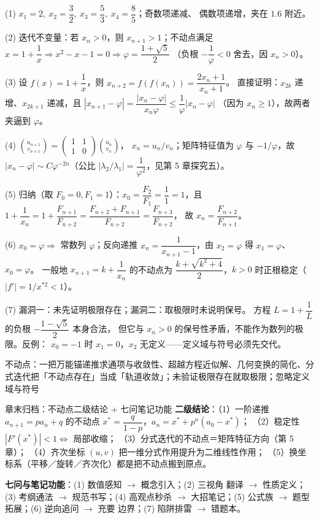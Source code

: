 \begin{solution}
(1) $x_1=2,\ x_2=\dfrac32,\ x_3=\dfrac53,\ x_4=\dfrac85$；奇数项递减、
偶数项递增，夹在 $1.6$ 附近。

(2) 迭代不变量：若 $x_n>0$，则 $x_{n+1}>1$；不动点满足
$x=1+\dfrac1x\Rightarrow x^2-x-1=0\Rightarrow \varphi=\dfrac{1+\sqrt5}{2}$
（负根 $-\dfrac1\varphi<0$ 舍去，因 $x_n>0$）。

(3) 设 $f(x)=1+\dfrac1x$，则 $x_{n+2}=f(f(x_n))=\dfrac{2x_n+1}{x_n+1}$。
直接证明：$x_{2k}$ 递增、$x_{2k+1}$ 递减，且
$|x_{n+1}-\varphi|=\dfrac{|x_n-\varphi|}{x_n\varphi}\le\dfrac1\varphi|x_n-\varphi|$
（因为 $x_n\ge1$），故两者夹逼到 $\varphi$。

(4) $\binom{u_{n+1}}{v_{n+1}}=\begin{pmatrix}1&1\\1&0\end{pmatrix}\binom{u_n}{v_n}$，
$x_n=u_n/v_n$；矩阵特征值为 $\varphi$ 与 $-1/\varphi$，故
$|x_n-\varphi|\sim C\varphi^{-2n}$（公比 $\left|\lambda_2/\lambda_1\right|
=\dfrac1{\varphi^2}$，见第 5 章探究五）。

(5) 归纳（取 $F_0=0,F_1=1$）：$x_0=\dfrac{F_2}{F_1}=\dfrac11=1$，且
$1+\dfrac1{x_n}=1+\dfrac{F_{n+1}}{F_{n+2}}
=\dfrac{F_{n+2}+F_{n+1}}{F_{n+2}}=\dfrac{F_{n+3}}{F_{n+2}}$，
故 $x_n=\dfrac{F_{n+2}}{F_{n+1}}$。

(6) $x_0=\varphi\Rightarrow$ 常数列 $\varphi$；反向递推
$x_n=\dfrac1{x_{n+1}-1}$，由 $x_2=\varphi$ 得 $x_1=\varphi$、$x_0=\varphi$。
一般地 $x_{n+1}=k+\dfrac1{x_n}$ 的不动点为
$\dfrac{k+\sqrt{k^2+4}}2$，$k>0$ 时正根稳定（$|f'|=1/x^{*2}<1$）。

(7) 漏洞一：未先证明极限存在；漏洞二：取极限时未说明保号。
方程 $L=1+\dfrac1L$ 的负根 $-\dfrac{1-\sqrt5}{2}$ 本身合法，
但它与 $x_n>0$ 的保号性矛盾，不能作为数列的极限。反例：
$x_0=-1$ 时 $x_1=0$，$x_2$ 无定义——定义域与符号必须先交代。
\end{solution}

\begin{conccard}{不动点：一把万能锚}{递推求通项与收敛性、超越方程近似解、几何变换的简化、分式迭代}{把「不动点存在」当成「轨道收敛」；未验证极限存在就取极限；忽略定义域与符号}
\end{conccard}

\begin{notezone}{章末归档：不动点二级结论 + 七问笔记功能}
\textbf{二级结论}：（1）一阶递推 $a_{n+1}=pa_n+q$ 的不动点
$x^*=\dfrac q{1-p}$，$a_n=x^*+p^n(a_0-x^*)$；
（2）稳定性 $|F'(x^*)|<1\Leftrightarrow$ 局部收缩；
（3）分式迭代的不动点＝矩阵特征方向（第 5 章）；
（4）齐次坐标 $(u,v)$ 把一维分式作用提升为二维线性作用；
（5）换坐标系（平移／旋转／齐次化）都是把不动点搬到原点。

\textbf{七问与笔记功能}：(1) 数值感知 $\to$ 概念引入；(2) 三视角
翻译 $\to$ 性质定义；(3) 考纲通法 $\to$ 规范书写；(4) 高观点秒杀
$\to$ 大招笔记；(5) 公式族 $\to$ 题型拓展；(6) 逆向追问 $\to$ 充要
边界；(7) 陷阱排雷 $\to$ 错题本。
\end{notezone}

